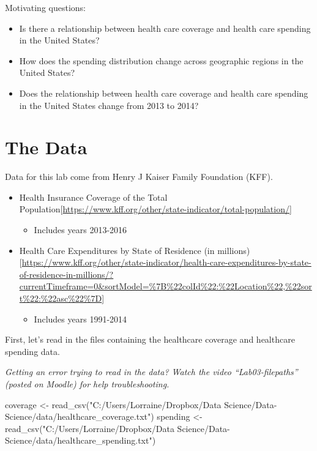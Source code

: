 \documentclass[
]{article}
\newenvironment{Shaded}{\begin{snugshade}}{\end{snugshade}}
\newcommand{\FunctionTok}[1]{\textcolor[rgb]{0.00,0.00,0.00}{#1}}
\newcommand{\NormalTok}[1]{#1}
\newcommand{\OtherTok}[1]{\textcolor[rgb]{0.56,0.35,0.01}{#1}}
\newcommand{\StringTok}[1]{\textcolor[rgb]{0.31,0.60,0.02}{#1}}
\providecommand{\tightlist}{%
  \setlength{\itemsep}{0pt}\setlength{\parskip}{0pt}}
\begin{document}
Motivating questions:

\begin{itemize}
\tightlist
\item
  Is there a relationship between health care coverage and health care
  spending in the United States?
\item
  How does the spending distribution change across geographic regions in
  the United States?
\item
  Does the relationship between health care coverage and health care
  spending in the United States change from 2013 to 2014?
\end{itemize}

\hypertarget{the-data}{%
\section{The Data}\label{the-data}}

Data for this lab come from Henry J Kaiser Family Foundation (KFF).

\begin{itemize}
\tightlist
\item
  Health Insurance Coverage of the Total
  Population{[}\url{https://www.kff.org/other/state-indicator/total-population/}{]}

  \begin{itemize}
  \tightlist
  \item
    Includes years 2013-2016
  \end{itemize}
\item
  Health Care Expenditures by State of Residence (in
  millions){[}\url{https://www.kff.org/other/state-indicator/health-care-expenditures-by-state-of-residence-in-millions/?currentTimeframe=0\&sortModel=\%7B\%22colId\%22:\%22Location\%22,\%22sort\%22:\%22asc\%22\%7D}{]}

  \begin{itemize}
  \tightlist
  \item
    Includes years 1991-2014
  \end{itemize}
\end{itemize}

First, let's read in the files containing the healthcare coverage and
healthcare spending data.

\emph{Getting an error trying to read in the data? Watch the video
``Lab03-filepaths'' (posted on Moodle) for help troubleshooting.}

\begin{Shaded}
\begin{Highlighting}[]
\NormalTok{coverage }\OtherTok{\textless{}{-}} \FunctionTok{read\_csv}\NormalTok{(}\StringTok{"C:/Users/Lorraine/Dropbox/Data Science/Data{-}Science/data/healthcare\_coverage.txt"}\NormalTok{)}
\NormalTok{spending }\OtherTok{\textless{}{-}} \FunctionTok{read\_csv}\NormalTok{(}\StringTok{"C:/Users/Lorraine/Dropbox/Data Science/Data{-}Science/data/healthcare\_spending.txt"}\NormalTok{)}
\end{Highlighting}
\end{Shaded}
\end{document}
